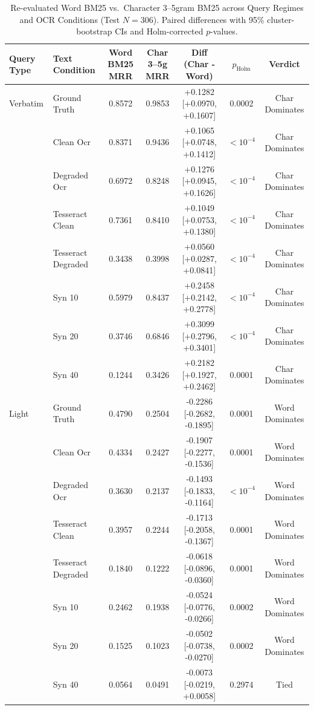 \begin{table}[t]
\centering\small
\caption{Re-evaluated Word BM25 vs.\ Character 3--5gram BM25 across Query Regimes and OCR Conditions (Test $N=306$). Paired differences with 95\% cluster-bootstrap CIs and Holm-corrected $p$-values.}\label{tab:char_vs_word_bm25_v6}
\begin{tabular}{llccccc}
\toprule
Query Type & Text Condition & Word BM25 MRR & Char 3--5g MRR & Diff (Char - Word) & $p_{\text{Holm}}$ & Verdict \\
\midrule
Verbatim & Ground Truth & 0.8572 & 0.9853 & +0.1282 [+0.0970, +0.1607] & 0.0002 & Char Dominates \\
 & Clean Ocr & 0.8371 & 0.9436 & +0.1065 [+0.0748, +0.1412] & $<10^{-4}$ & Char Dominates \\
 & Degraded Ocr & 0.6972 & 0.8248 & +0.1276 [+0.0945, +0.1626] & $<10^{-4}$ & Char Dominates \\
 & Tesseract Clean & 0.7361 & 0.8410 & +0.1049 [+0.0753, +0.1380] & $<10^{-4}$ & Char Dominates \\
 & Tesseract Degraded & 0.3438 & 0.3998 & +0.0560 [+0.0287, +0.0841] & $<10^{-4}$ & Char Dominates \\
 & Syn 10 & 0.5979 & 0.8437 & +0.2458 [+0.2142, +0.2778] & $<10^{-4}$ & Char Dominates \\
 & Syn 20 & 0.3746 & 0.6846 & +0.3099 [+0.2796, +0.3401] & $<10^{-4}$ & Char Dominates \\
 & Syn 40 & 0.1244 & 0.3426 & +0.2182 [+0.1927, +0.2462] & 0.0001 & Char Dominates \\
Light & Ground Truth & 0.4790 & 0.2504 & -0.2286 [-0.2682, -0.1895] & 0.0001 & Word Dominates \\
 & Clean Ocr & 0.4334 & 0.2427 & -0.1907 [-0.2277, -0.1536] & 0.0001 & Word Dominates \\
 & Degraded Ocr & 0.3630 & 0.2137 & -0.1493 [-0.1833, -0.1164] & $<10^{-4}$ & Word Dominates \\
 & Tesseract Clean & 0.3957 & 0.2244 & -0.1713 [-0.2058, -0.1367] & 0.0001 & Word Dominates \\
 & Tesseract Degraded & 0.1840 & 0.1222 & -0.0618 [-0.0896, -0.0360] & 0.0001 & Word Dominates \\
 & Syn 10 & 0.2462 & 0.1938 & -0.0524 [-0.0776, -0.0266] & 0.0002 & Word Dominates \\
 & Syn 20 & 0.1525 & 0.1023 & -0.0502 [-0.0738, -0.0270] & 0.0002 & Word Dominates \\
 & Syn 40 & 0.0564 & 0.0491 & -0.0073 [-0.0219, +0.0058] & 0.2974 & Tied \\

\end{tabular}
\end{table}

